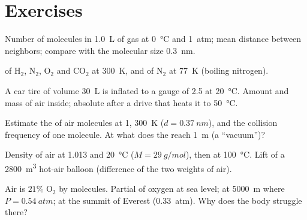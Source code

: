 \section{Exercises}

\begin{exercise}[$\star$]\label{exo:b1:kinetic-theory:1}
Number of molecules in \qty{1.0}{L} of gas at \qty{0}{\degreeCelsius} and
\qty{1}{atm}; mean distance between neighbors; compare with the molecular
size \qty{0.3}{nm}.
\end{exercise}

\begin{exercise}[$\star$]\label{exo:b1:kinetic-theory:2}
 of H$_2$, N$_2$, O$_2$ and CO$_2$ at \qty{300}{K},
and of N$_2$ at \qty{77}{K} (boiling nitrogen).
\end{exercise}

\begin{exercise}[$\star$]\label{exo:b1:kinetic-theory:3}
A car tire of volume \qty{30}{L} is inflated to a gauge  of
\qty{2.5}{} at \qty{20}{\degreeCelsius}. Amount and mass of air inside;
absolute  after a drive that heats it to \qty{50}{\degreeCelsius}.
\end{exercise}

\begin{exercise}[$\star$]\label{exo:b1:kinetic-theory:4}
Estimate the  of air molecules at \qty{1}{}, \qty{300}{K}
($d = \qty{0.37}{nm}$), and the collision frequency of one molecule. At
what  does the  reach \qty{1}{m} (a ``vacuum'')?
\end{exercise}

\begin{exercise}[$\star\star$]\label{exo:b1:kinetic-theory:5}
Density of air at \qty{1.013}{} and \qty{20}{\degreeCelsius}
($M = \qty{29}{g/mol}$), then at \qty{100}{\degreeCelsius}. Lift of a
\qty{2800}{m^3} hot-air balloon (difference of the two weights of air).
\end{exercise}

\begin{exercise}[$\star\star$]\label{exo:b1:kinetic-theory:6}
Air is $21\%$ O$_2$ by molecules. Partial  of oxygen at sea level;
at \qty{5000}{m} where $P = \qty{0.54}{atm}$; at the summit of Everest
(\qty{0.33}{atm}). Why does the body struggle there?
\end{exercise}

